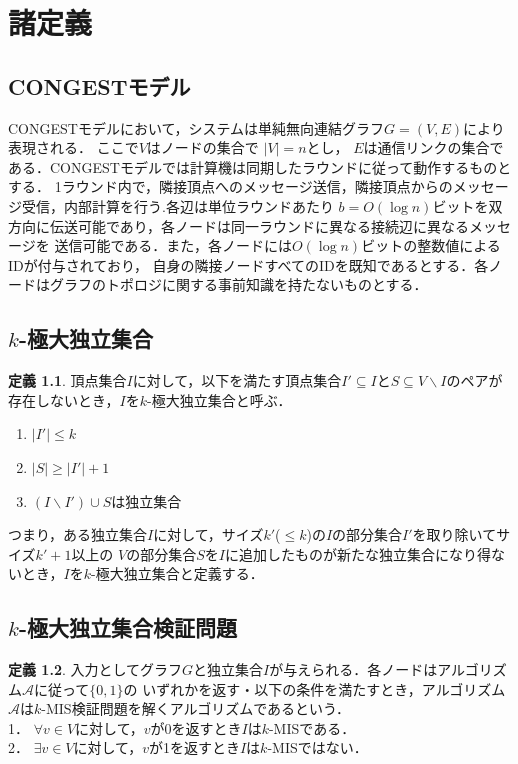 \documentclass[12pt]{thesis}
\newcommand{\CONGEST}{\textsf{CONGEST}}
\theoremstyle{definition}
\newtheorem{definition}{定義}[chapter]
\begin{document}
\chapter{諸定義}

\section{{\CONGEST}モデル}
{\CONGEST}モデルにおいて，システムは単純無向連結グラフ$G =  (V,E)$により表現される．
ここで$V$はノードの集合で $|V| = n$とし， $E$は通信リンクの集合である．{\CONGEST}モデルでは計算機は同期したラウンドに従って動作するものとする．
1ラウンド内で，隣接頂点へのメッセージ送信，隣接頂点からのメッセージ受信，内部計算を行う.各辺は単位ラウンドあたり
$b = O(\log n)$ビットを双方向に伝送可能であり，各ノードは同一ラウンドに異なる接続辺に異なるメッセージを
送信可能である．また，各ノードには$O(\log n)$ビットの整数値によるIDが付与されており，
自身の隣接ノードすべてのIDを既知であるとする．各ノードはグラフのトポロジに関する事前知識を持たないものとする．

\section{$k$-極大独立集合}
\begin{definition}
頂点集合$I$に対して，以下を満たす頂点集合$I' \subseteq I$と$S\subseteq V \backslash I$のペアが
存在しないとき，$I$を$k$-極大独立集合と呼ぶ．
\begin{enumerate}
\item $|I'| \leq k$
\item $|S| \geq |I'| + 1$
\item $(I \backslash I') \cup S$は独立集合
\end{enumerate}
\end{definition}
つまり，ある独立集合$I$に対して，サイズ$k'$($\leq k$)の$I$の部分集合$I'$を取り除いてサイズ$k' + 1$以上の
$V$の部分集合$S$を$I$に追加したものが新たな独立集合になり得ないとき，$I$を$k$-極大独立集合と定義する．

\section{$k$-極大独立集合検証問題}
\begin{definition}
入力としてグラフ$G$と独立集合$I$が与えられる．各ノードはアルゴリズム$\mathcal{A}$に従って$\{0,1\}$の
いずれかを返す・以下の条件を満たすとき，アルゴリズム$\mathcal{A}$は$k$-MIS検証問題を解くアルゴリズムであるという．\\
1． $\forall v\in V$に対して，$v$が0を返すとき$I$は$k$-MISである．\\
2． $\exists v \in V$に対して，$v$が1を返すとき$I$は$k$-MISではない．
\end{definition}
\end{document}
